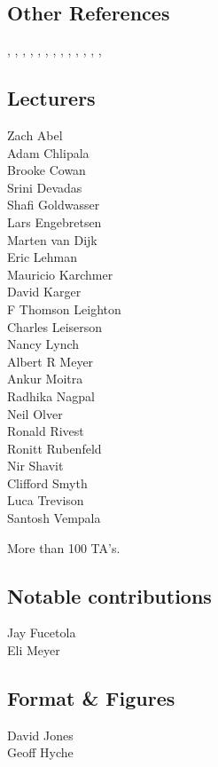 \subsection*{Other References}

\cite{Apostol67},
\cite{Beam17},
\cite{Berkeley75},
\cite{Chow98},
\cite{Fagin95},
\cite{GareyJohnson70},
\cite{Gelfond34},
\cite{Malkiel03},
\cite{Meyer69},
\cite{MichaelsR91},
\cite{Paterson09},
\cite{Stockmeyer73},
\cite{Stueben98},


\subsection*{Lecturers}

Zach Abel\\
Adam Chlipala\\
Brooke Cowan\\
Srini Devadas\\
Shafi Goldwasser\\
Lars Engebretsen\\
Marten van Dijk\\
Eric Lehman\\
Mauricio Karchmer\\
David Karger\\
F Thomson Leighton\\
Charles Leiserson\\
Nancy Lynch\\
Albert R Meyer\\
Ankur Moitra\\
Radhika Nagpal\\
Neil Olver\\
Ronald Rivest\\
Ronitt Rubenfeld\\
Nir Shavit\\
Clifford Smyth\\
Luca Trevison\\
Santosh Vempala

More than 100 TA's.

\subsection*{Notable contributions}

Jay Fucetola\\
Eli Meyer

\subsection*{Format \& Figures}
David Jones\\
Geoff Hyche

\endinput
